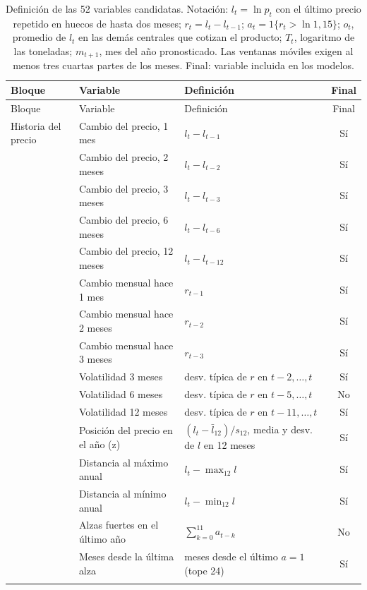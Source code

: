 \footnotesize
\begin{longtable}{>{\raggedright\arraybackslash}p{2.3cm}>{\raggedright\arraybackslash}p{4.1cm}>{\raggedright\arraybackslash}p{6.2cm}c}
\caption{Definición de las 52 variables candidatas. Notación: $l_t=\ln p_t$ con el último precio repetido en huecos de hasta dos meses; $r_t=l_t-l_{t-1}$; $a_t=1\{r_t>\ln 1{,}15\}$; $o_t$, promedio de $l_t$ en las demás centrales que cotizan el producto; $T_t$, logaritmo de las toneladas; $m_{t+1}$, mes del año pronosticado. Las ventanas móviles exigen al menos tres cuartas partes de los meses. Final: variable incluida en los modelos.}\label{tab:variables}\\
\toprule Bloque & Variable & Definición & Final\\ \midrule\endfirsthead
\toprule Bloque & Variable & Definición & Final\\ \midrule\endhead
\bottomrule\endfoot
Historia del precio & Cambio del precio, 1 mes & $l_t-l_{t-1}$ & Sí \\
 & Cambio del precio, 2 meses & $l_t-l_{t-2}$ & Sí \\
 & Cambio del precio, 3 meses & $l_t-l_{t-3}$ & Sí \\
 & Cambio del precio, 6 meses & $l_t-l_{t-6}$ & Sí \\
 & Cambio del precio, 12 meses & $l_t-l_{t-12}$ & Sí \\
 & Cambio mensual hace 1 mes & $r_{t-1}$ & Sí \\
 & Cambio mensual hace 2 meses & $r_{t-2}$ & Sí \\
 & Cambio mensual hace 3 meses & $r_{t-3}$ & Sí \\
 & Volatilidad 3 meses & desv. típica de $r$ en $t-2,\dots,t$ & Sí \\
 & Volatilidad 6 meses & desv. típica de $r$ en $t-5,\dots,t$ & No \\
 & Volatilidad 12 meses & desv. típica de $r$ en $t-11,\dots,t$ & Sí \\
 & Posición del precio en el año (z) & $(l_t-\bar l_{12})/s_{12}$, media y desv. de $l$ en 12 meses & Sí \\
 & Distancia al máximo anual & $l_t-\max_{12}l$ & Sí \\
 & Distancia al mínimo anual & $l_t-\min_{12}l$ & Sí \\
 & Alzas fuertes en el último año & $\sum_{k=0}^{11}a_{t-k}$ & No \\
 & Meses desde la última alza & meses desde el último $a=1$ (tope 24) & Sí \\
\addlinespace[2pt]

\end{longtable}
